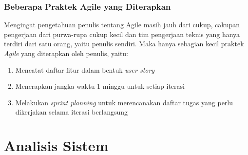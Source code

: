 \documentclass[a4paper, 12pt, oneside]{report}
\begin{document}
\subsection{Beberapa Praktek Agile yang Diterapkan}

\onehalfspacing Mengingat pengetahuan penulis tentang Agile masih jauh dari cukup, cakupan pengerjaan dari purwa-rupa cukup kecil dan tim pengerjaan teknis yang hanya terdiri dari satu orang, yaitu penulis sendiri. Maka hanya sebagian kecil praktek \textit{Agile} yang diterapkan oleh penulis, yaitu:

\begin{enumerate}
  \item Mencatat daftar fitur dalam bentuk \textit{user story}
  \item Menerapkan jangka waktu 1 minggu untuk setiap iterasi
  \item Melakukan \textit{sprint planning} untuk merencanakan daftar tugas yang perlu dikerjakan selama iterasi berlangsung
\end{enumerate}

\chapter{Analisis Sistem}
\end{document}
